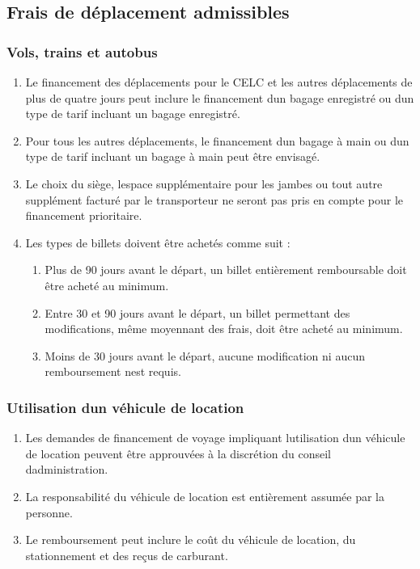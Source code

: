 \subsection{Frais de déplacement admissibles}
\label{frais-de-deplacement-admissibles}

\subsubsection{Vols, trains et autobus}
\label{vols-trains-et-autobus}

\begin{enumerate}
 \item
  Le financement des déplacements pour le CELC et les autres déplacements de plus de quatre jours peut inclure le financement d\textquotesingle un bagage enregistré ou d\textquotesingle un type de tarif incluant un bagage enregistré.
 \item
  Pour tous les autres déplacements, le financement d\textquotesingle un bagage à main ou d\textquotesingle un type de tarif incluant un bagage à main peut être envisagé.
 \item
  Le choix du siège, l\textquotesingle espace supplémentaire pour les jambes ou tout autre supplément facturé par le transporteur ne seront pas pris en compte pour le financement prioritaire.
 \item
  Les types de billets doivent être achetés comme suit :

  \begin{enumerate}
   \item
    Plus de 90 jours avant le départ, un billet entièrement remboursable doit être acheté au minimum.
   \item
    Entre 30 et 90 jours avant le départ, un billet permettant des modifications, même moyennant des frais, doit être acheté au minimum.
   \item
    Moins de 30 jours avant le départ, aucune modification ni aucun remboursement n\textquotesingle est requis.
  \end{enumerate}
\end{enumerate}

\subsubsection{Utilisation d\textquotesingle un véhicule de location}
\label{utilisation-d-un-vehicule-de-location}

\begin{enumerate}
 \item
  Les demandes de financement de voyage impliquant l\textquotesingle utilisation d\textquotesingle un véhicule de location peuvent être approuvées à la discrétion du conseil d\textquotesingle administration.
 \item
  La responsabilité du véhicule de location est entièrement assumée par la personne.
 \item
  Le remboursement peut inclure le coût du véhicule de location, du stationnement et des reçus de carburant.
\end{enumerate}

